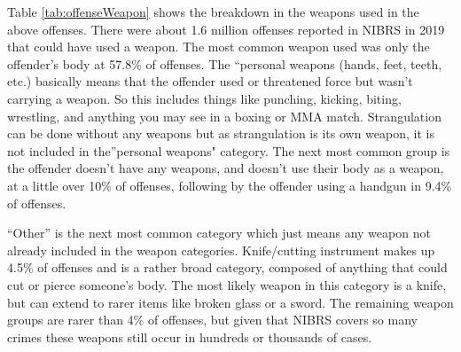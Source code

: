 \documentclass[
  12pt,
  openany]{book}
\begin{document}
Table \ref{tab:offenseWeapon} shows the breakdown in the weapons used in the above offenses. There were about 1.6 million offenses reported in NIBRS in 2019 that could have used a weapon. The most common weapon used was only the offender's body at 57.8\% of offenses. The ``personal weapons (hands, feet, teeth, etc.) basically means that the offender used or threatened force but wasn't carrying a weapon. So this includes things like punching, kicking, biting, wrestling, and anything you may see in a boxing or MMA match. Strangulation can be done without any weapons but as strangulation is its own weapon, it is not included in the''personal weapons" category. The next most common group is the offender doesn't have any weapons, and doesn't use their body as a weapon, at a little over 10\% of offenses, following by the offender using a handgun in 9.4\% of offenses.

``Other'' is the next most common category which just means any weapon not already included in the weapon categories. Knife/cutting instrument makes up 4.5\% of offenses and is a rather broad category, composed of anything that could cut or pierce someone's body. The most likely weapon in this category is a knife, but can extend to rarer items like broken glass or a sword. The remaining weapon groups are rarer than 4\% of offenses, but given that NIBRS covers so many crimes these weapons still occur in hundreds or thousands of cases.
\end{document}
